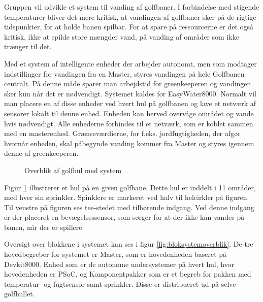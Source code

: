 Gruppen vil udvikle et system til vanding af golfbaner. I forbindelse med stigende temperaturer bliver det mere kritisk, at vandingen af golfbaner sker på de rigtige tidspunkter, for at holde banen spilbar. For at spare på ressourcerne er det også kritisk, ikke at spilde store mængder vand, på vanding af områder som ikke trænger til det. 

Med et system af intelligente enheder der arbejder autonomt, men som modtager indstillinger for vandingen fra en Master, styres vandingen på hele Golfbanen centralt. På denne måde sparer man arbejdstid for greenkeeperen og vandingen sker kun når det er nødvendigt. Systemet kaldes for EasyWater8000. 
Normalt vil man placere en af disse enheder ved hvert hul på golfbanen og lave et netværk af sensorer lokalt til denne enhed. Enheden kan herved overvåge området og vande hvis nødvendigt. Alle enhederne forbindes til et netværk, som er koblet sammen med en masterenhed. Grænseværdierne, for f.eks. jordfugtigheden, der afgør hvornår enheden, skal påbegynde vanding kommer fra Master og styres igennem denne af greenkeeperen. 


\begin{figure}[ht] \centering
{}
\caption{Overblik af golfhul med system}
\label{fig:systemoverblik}
\end{figure}

Figur \ref{fig:systemoverblik} illustrerer et hul på en given golfbane. Dette hul er inddelt i 11 områder, med hver sin sprinkler. Spinklere er markeret ved halv til helcirkler på figuren. Til venstre på figuren ses tee-stedet med tilhørende indgang. Ved denne indgang er der placeret en bevægelsessensor, som sørger for at der ikke kan vandes på banen, når der er spillere. 

Oversigt over blokkene i systemet kan ses i figur \ref{fig:bloksystemoverblik}. De tre hovedbegreber for systemet er Master, som er hovedenheden baseret på Devkit8000. Enhed som er de autonome undersystemer på hvert hul, hvor hovedenheden er PSoC, og Komponentpakker som er et begreb for pakken med temperatur- og fugtsensor samt sprinkler. Disse er distribueret ud på selve golfhullet.

